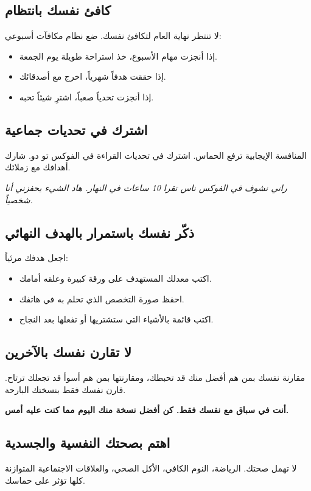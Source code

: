 \documentclass[12pt,a4paper]{book}
\newcommand{\quoteAr}[1]{%
	\begin{myquote}
		\itshape #1
	\end{myquote}
}
\newcommand{\importantAr}[1]{%
	\begin{important}
		\bfseries #1
	\end{important}
}
\begin{document}
	\subsection{كافئ نفسك بانتظام}
	لا تنتظر نهاية العام لتكافئ نفسك. ضع نظام مكافآت أسبوعي:
	\begin{itemize}
		\item إذا أنجزت مهام الأسبوع، خذ استراحة طويلة يوم الجمعة.
		\item إذا حققت هدفاً شهرياً، اخرج مع أصدقائك.
		\item إذا أنجزت تحدياً صعباً، اشترِ شيئاً تحبه.
	\end{itemize}
	
	\subsection{اشترك في تحديات جماعية}
	المنافسة الإيجابية ترفع الحماس. اشترك في تحديات القراءة في الفوكس تو دو. شارك أهدافك مع زملائك.
	
	\quoteAr{راني نشوف في الفوكس ناس تقرا 10 ساعات في النهار. هاد الشيء يحفزني أنا شخصياً.}
	
	\subsection{ذكّر نفسك باستمرار بالهدف النهائي}
	اجعل هدفك مرئياً:
	\begin{itemize}
		\item اكتب معدلك المستهدف على ورقة كبيرة وعلقه أمامك.
		\item احفظ صورة التخصص الذي تحلم به في هاتفك.
		\item اكتب قائمة بالأشياء التي ستشتريها أو تفعلها بعد النجاح.
	\end{itemize}
	
	\subsection{لا تقارن نفسك بالآخرين}
	مقارنة نفسك بمن هم أفضل منك قد تحبطك، ومقارنتها بمن هم أسوأ قد تجعلك ترتاح. قارن نفسك فقط بنسختك البارحة.
	
	\importantAr{أنت في سباق مع نفسك فقط. كن أفضل نسخة منك اليوم مما كنت عليه أمس.}
	
	\subsection{اهتم بصحتك النفسية والجسدية}
	لا تهمل صحتك. الرياضة، النوم الكافي، الأكل الصحي، والعلاقات الاجتماعية المتوازنة كلها تؤثر على حماسك.
	
\end{document}
